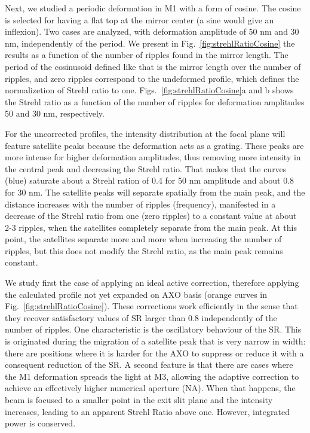 \documentclass[preprint]{iucr}              %
\begin{document}
Next, we studied a periodic deformation in M1 with a form of cosine. The cosine is selected for having a flat top at the mirror center (a sine would give an inflexion). Two cases are analyzed, with deformation  amplitude of 50 nm and 30 nm, independently of the period. We present in Fig.~\ref{fig:strehlRatioCosine} the results as a function of the number of ripples found in the mirror length. The period of the cosinusoid defined like that is the mirror length over the number of ripples, and zero ripples correspond to the undeformed profile, which defines the normalizetion of Strehl ratio to one. Figs.~\ref{fig:strehlRatioCosine}a and b shows the Strehl ratio as a function of the number of ripples for deformation amplitudes 50 and 30 nm, respectively.

For the uncorrected profiles, the intensity distribution at the focal plane will feature satellite peaks because the deformation acts as a grating. These peaks are more intense for higher deformation amplitudes, thus removing more intensity in the central peak and decreasing the Strehl ratio. That makes that the curves (blue) saturate about a Strehl ration of 0.4 for 50 nm amplitude and about 0.8 for 30 nm. The satellite peaks will separate spatially from the main peak, and the distance increases with the number of ripples (frequency), manifested in a decrease of the Strehl ratio from one (zero ripples) to a constant value at about 2-3 ripples, when the satellites completely separate from the main peak. At this point, the satellites separate more and more when increasing the number of ripples, but this does not modify the Strehl ratio, as the main peak remains constant. 

We study first the case of applying an ideal active correction, therefore applying the calculated profile not yet expanded on AXO basis (orange curves in Fig.~\ref{fig:strehlRatioCosine}). These corrections work efficiently in the sense that they recover satisfactory values of SR larger than 0.8 independently of the number of ripples. One characteristic is the oscillatory behaviour of the SR. This is originated during the migration of a satellite peak that is very narrow in width: there are positions where it is harder for the AXO to suppress or reduce it with a consequent reduction of the SR. A second feature is that there are cases where the M1 deformation spreads the light at M3, allowing the adaptive correction to achieve an effectively higher numerical aperture (NA). When that happens, the beam is focused to a smaller point in the exit slit plane and the intensity increases, leading to an apparent Strehl Ratio above one. However, integrated power is conserved. 
\end{document}
